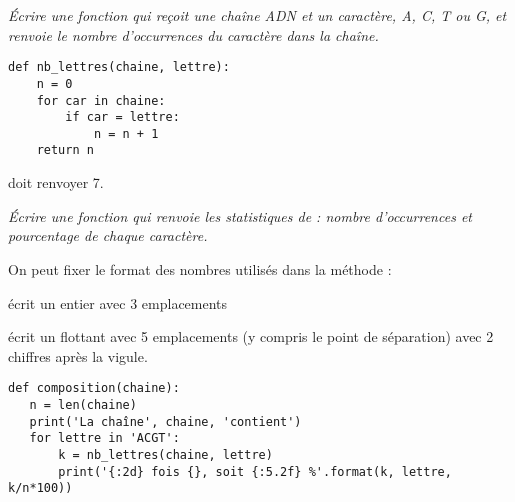 \begin{Exercise}[title = Compter]\it 
Écrire une fonction  qui reçoit une chaîne ADN et un caractère, A, C, T ou G, et renvoie le nombre d'occurrences du caractère dans la chaîne.
\end{Exercise}
\begin{Answer}
\begin{lstlisting}
def nb_lettres(chaine, lettre):
    n = 0
    for car in chaine:
        if car = lettre:
            n = n + 1
    return n
\end{lstlisting}
\end{Answer}
 doit renvoyer 7.
\begin{Exercise}[title = Statistiques]\it 
Écrire une fonction  qui renvoie les statistiques de  : nombre d’occurrences et pourcentage de chaque caractère.
\end{Exercise}
\begin{Answer}
On peut fixer le format des nombres utilisés dans la méthode  :

 écrit un entier avec 3 emplacements

 écrit un flottant avec 5 emplacements (y compris le point de séparation) avec 2 chiffres après la vigule.

\begin{lstlisting}
def composition(chaine):
   n = len(chaine)
   print('La chaîne', chaine, 'contient')
   for lettre in 'ACGT':
       k = nb_lettres(chaine, lettre)
       print('{:2d} fois {}, soit {:5.2f} %'.format(k, lettre, k/n*100))
\end{lstlisting}
\end{Answer}
